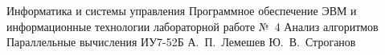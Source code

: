 \makereporttitle
    {Информатика и системы управления}
    {Программное обеспечение ЭВМ и информационные технологии}
    {лабораторной работе №~4}
    {Анализ алгоритмов}
    {Параллельные вычисления}
    {}
    {ИУ7-52Б}
    {А.~П.~Лемешев}
    {Ю.~В.~Строганов}
    {}